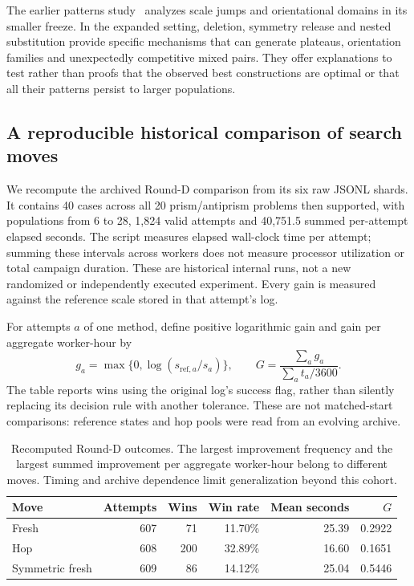 \documentclass[11pt,a4paper]{article}
\begin{document}
The earlier patterns study~\cite{zarzueloPatterns} analyzes scale jumps and orientational domains in its smaller freeze. In the expanded setting, deletion, symmetry release and nested substitution provide specific mechanisms that can generate plateaus, orientation families and unexpectedly competitive mixed pairs. They offer explanations to test rather than proofs that the observed best constructions are optimal or that all their patterns persist to larger populations.

\subsection{A reproducible historical comparison of search moves}
We recompute the archived Round-D comparison from its six raw JSONL shards. It contains 40 cases across all 20 prism/antiprism problems then supported, with populations from 6 to 28, 1,824 valid attempts and 40,751.5 summed per-attempt elapsed seconds. The script measures elapsed wall-clock time per attempt; summing these intervals across workers does not measure processor utilization or total campaign duration. These are historical internal runs, not a new randomized or independently executed experiment. Every gain is measured against the reference scale stored in that attempt's log.

For attempts $a$ of one method, define positive logarithmic gain and gain per aggregate worker-hour by
\begin{equation}
g_a=\max\{0,\log(s_{\mathrm{ref},a}/s_a)\},\qquad
G=\frac{\sum_a g_a}{\sum_a t_a/3600}.
\end{equation}
The table reports wins using the original log's success flag, rather than silently replacing its decision rule with another tolerance. These are not matched-start comparisons: reference states and hop pools were read from an evolving archive.

\begin{table}[htbp]
\centering\small
\begin{tabular}{lrrrrr}
\toprule
Move & Attempts & Wins & Win rate & Mean seconds & $G$\\
\midrule
Fresh & 607 & 71 & 11.70\% & 25.39 & 0.2922\\
Hop & 608 & 200 & 32.89\% & 16.60 & 0.1651\\
Symmetric fresh & 609 & 86 & 14.12\% & 25.04 & 0.5446\\
\bottomrule
\end{tabular}
\caption{Recomputed Round-D outcomes. The largest improvement frequency and the largest summed improvement per aggregate worker-hour belong to different moves. Timing and archive dependence limit generalization beyond this cohort.}
\label{tab:bench}
\end{table}
\end{document}
